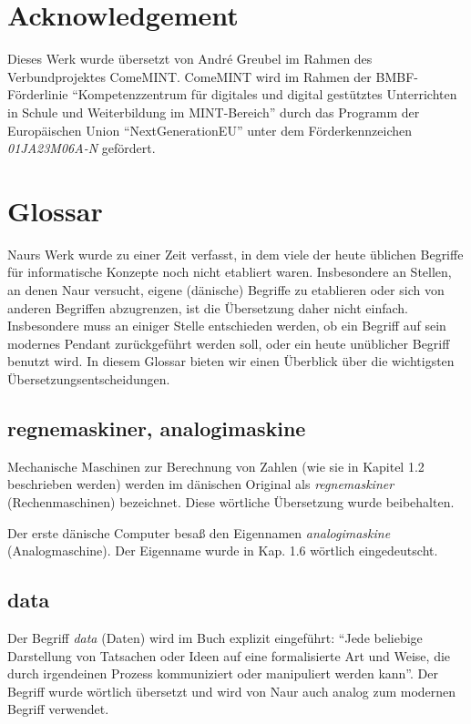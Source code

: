 \section{Acknowledgement}

Dieses Werk wurde übersetzt von André Greubel im Rahmen des Verbundprojektes ComeMINT. ComeMINT wird im Rahmen der BMBF-Förderlinie \enquote{Kompetenzzentrum für digitales und digital gestütztes Unterrichten in Schule und Weiterbildung im MINT-Bereich} durch das Programm der Europäischen Union \enquote{NextGenerationEU} unter dem Förderkennzeichen \emph{01JA23M06A-N} gefördert. 


\section*{Glossar}

    Naurs Werk wurde zu einer Zeit verfasst, in dem viele der heute üblichen Begriffe für informatische Konzepte noch nicht etabliert waren. Insbesondere an Stellen, an denen Naur versucht, eigene (dänische) Begriffe zu etablieren oder sich von anderen Begriffen abzugrenzen, ist die Übersetzung daher nicht einfach. Insbesondere muss an einiger Stelle entschieden werden, ob ein Begriff auf sein modernes Pendant zurückgeführt werden soll, oder ein heute unüblicher Begriff benutzt wird. In diesem Glossar bieten wir einen Überblick über die wichtigsten Übersetzungsentscheidungen.
    
\subsection{regnemaskiner, analogimaskine}

    Mechanische Maschinen zur Berechnung von Zahlen (wie sie in Kapitel 1.2 beschrieben werden) werden im dänischen Original als \emph{regnemaskiner} (Rechenmaschinen) bezeichnet. Diese wörtliche Übersetzung wurde beibehalten.
    
    Der erste dänische Computer besaß den Eigennamen \emph{analogimaskine} (Analogmaschine). Der Eigenname wurde in Kap. 1.6 wörtlich eingedeutscht.


\subsection{data}
    Der Begriff \emph{data} (Daten) wird im Buch explizit eingeführt: \enquote{Jede beliebige Darstellung von Tatsachen oder Ideen auf eine formalisierte Art und Weise, die durch irgendeinen Prozess kommuniziert oder manipuliert werden kann}. Der Begriff wurde wörtlich übersetzt und wird von Naur auch analog zum modernen Begriff verwendet. 
    
